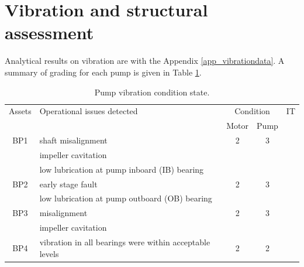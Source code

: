 \section{Vibration and structural assessment}
Analytical results on vibration are with the Appendix \ref{app_vibrationdata}. A summary of grading for each pump is given in Table \ref{ch05_tbl_vibration}.

\begin{table}[!h]
	\caption{Pump vibration condition state.}
	\label{ch05_tbl_vibration}
	{\footnotesize
\begin{tabular}{l|l|l|l|l}
	\hline
	\multicolumn{1}{c|}{Assets} & Operational issues detected & \multicolumn{2}{c}{Condition} & \multicolumn{1}{c}{IT} \\ 
	\cline{3-4}
	\multicolumn{1}{c|}{} &  & \multicolumn{1}{c|}{Motor} & \multicolumn{1}{c|}{Pump} & \multicolumn{1}{c}{} \\ 
	\hline
	\multicolumn{1}{c|}{BP1} & shaft misalignment & \multicolumn{1}{c|}{2} & \multicolumn{1}{c|}{3} & \multicolumn{1}{c}{} \\ 
	\multicolumn{1}{c|}{} & impeller cavitation & \multicolumn{1}{c|}{} & \multicolumn{1}{c|}{} & \multicolumn{1}{c}{} \\ 
	\multicolumn{1}{c|}{} & low lubrication at pump inboard (IB) bearing & \multicolumn{1}{c|}{} & \multicolumn{1}{c|}{} & \multicolumn{1}{c}{} \\ 
	\hline
	\multicolumn{1}{c|}{BP2} & early stage fault  & \multicolumn{1}{c|}{2} & \multicolumn{1}{c|}{3} & \multicolumn{1}{c}{} \\ 
	\multicolumn{1}{c|}{} & low lubrication at pump outboard (OB) bearing & \multicolumn{1}{c|}{} & \multicolumn{1}{c|}{} & \multicolumn{1}{c}{} \\ 
	\hline
	\multicolumn{1}{c|}{BP3} & misalignment & \multicolumn{1}{c|}{2} & \multicolumn{1}{c|}{3} & \multicolumn{1}{c}{} \\ 
	\multicolumn{1}{c|}{} & impeller cavitation & \multicolumn{1}{c|}{} & \multicolumn{1}{c|}{} & \multicolumn{1}{c}{} \\ 
	\hline
	\multicolumn{1}{c|}{BP4} & vibration in all bearings were within acceptable levels & \multicolumn{1}{c|}{2} & \multicolumn{1}{c|}{2} & \multicolumn{1}{c}{} \\ 

\end{tabular}}
\end{table}

